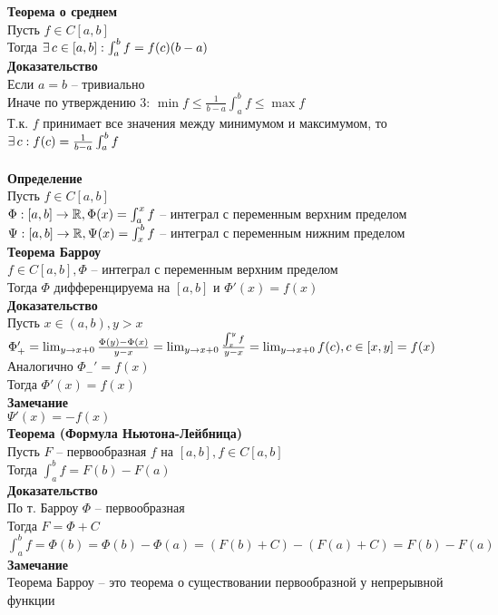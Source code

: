 \documentclass[12pt]{article}
\begin{document}
\textbf{Теорема о среднем}\\
Пусть $f \in C[a,b]$\\
Тогда $\exists\, c \in [a,b]: \int_a^b f = f(c)(b-a)$\\
\textbf{Доказательство}\\
Если $a = b$ -- тривиально\\
Иначе по утверждению 3: $\min f \leq \frac{1}{b-a}\int_a^b f \leq \max f$\\
Т.к. $f$ принимает все значения между минимумом и максимумом, то $\exists\, c: f(c) = \frac{1}{b-a}\int_a^b f$\\\\
\textbf{Определение}\\
Пусть $f \in C[a,b]$\\
$\Phi: [a,b] \to \mathbb{R}, \Phi(x) = \int_a^x f$ -- интеграл с переменным верхним пределом\\
$\Psi: [a,b] \to \mathbb{R}, \Psi(x) = \int_x^b f$ -- интеграл с переменным нижним пределом\\
\textbf{Теорема Барроу}\\
$f\in C[a,b], \Phi$ -- интеграл с переменным верхним пределом\\
Тогда $\Phi$ дифференцируема на $[a,b]$ и $\Phi'(x) = f(x)$\\
\textbf{Доказательство}\\
Пусть $x \in (a,b), y > x$\\
$\Phi_+' = \lim_{y \rightarrow x+0} \frac{\Phi(y) - \Phi(x)}{y-x} = \lim_{y\rightarrow x+0}\frac{\int_x^y f}{y-x} = \lim_{y\rightarrow x+0}f(c), c\in [x,y] = f(x)$\\
Аналогично $\Phi_-' = f(x)$\\
Тогда $\Phi'(x) = f(x)$\\
\textbf{Замечание}\\
$\Psi'(x) = -f(x)$\\
\textbf{Теорема (Формула Ньютона-Лейбница)}\\
Пусть $F$ -- первообразная $f$ на $[a,b], f \in C[a,b]$\\
Тогда $\int_a^b f = F(b)-F(a)$\\
\textbf{Доказательство}\\
По т. Барроу $\Phi$ -- первообразная\\
Тогда $F = \Phi + C$\\
$\int_a^b f = \Phi(b) = \Phi(b) - \Phi(a) = (F(b) + C) - (F(a) + C) = F(b) - F(a)$\\
\textbf{Замечание}\\
Теорема Барроу -- это теорема о существовании первообразной у непрерывной функции\\
\end{document}
